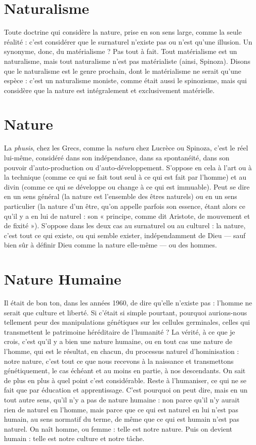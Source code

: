\section{Naturalisme}
Toute doctrine qui considère la nature, prise en son sens
large, comme la seule réalité : c’est considérer que le surnaturel
n’existe pas ou n’est qu’une illusion. Un synonyme, donc, du
matérialisme ? Pas tout à fait. Tout matérialisme est un naturalisme, mais tout
naturalisme n’est pas matérialiste (ainsi, Spinoza). Disons que le naturalisme
est le genre prochain, dont le matérialisme ne serait qu’une espèce : c'est un
naturalisme moniste, comme était aussi le spinozisme, mais qui considère que
la nature est intégralement et exclusivement matérielle.

\section{Nature}
La {\it phusis}, chez les Grecs, comme la {\it natura} chez Lucrèce ou Spinoza,
c’est le réel lui-même, considéré dans son indépendance,
dans sa spontanéité, dans son pouvoir d’auto-production ou d’auto-développement.
S’oppose en cela à l’art ou à la technique (comme ce qui se fait tout seul
à ce qui est fait par l’homme) et au divin (comme ce qui se développe ou
change à ce qui est immuable). Peut se dire en un sens général (la nature est
l’ensemble des êtres naturels) ou en un sens particulier (la nature d’un être,
qu’on appelle parfois son essence, étant alors ce qu’il y a en lui de naturel : son
« principe, comme dit Aristote, de mouvement et de fixité »). S’oppose dans les
deux cas au surnaturel ou au culturel : la nature, c’est tout ce qui existe, ou qui
semble exister, indépendamment de Dieu — sauf bien sûr à définir Dieu comme
la nature elle-même — ou des hommes.

\section{Nature Humaine}
Il était de bon ton, dans les années 1960, de dire
qu’elle n’existe pas : l’homme ne serait que culture et
liberté. Si c'était si simple pourtant, pourquoi aurions-nous tellement peur des
manipulations génétiques sur les cellules germinales, celles qui transmettent le
patrimoine héréditaire de l'humanité ? La vérité, à ce que je crois, c’est qu’il y
a bien une nature humaine, ou en tout cas une nature de l’homme, qui est le
résultat, en chacun, du processus naturel d’hominisation : notre nature, c’est
tout ce que nous recevons à la naissance et transmettons génétiquement, le cas
échéant et au moins en partie, à nos descendants. On sait de plus en plus à quel
point c’est considérable. Reste à l’humaniser, ce qui ne se fait que par éducation
et apprentissage. C’est pourquoi on peut dire, mais en un tout autre sens, qu’il
n'y a pas de nature humaine : non parce qu’il n’y aurait rien de naturel en
l’homme, mais parce que ce qui est naturel en lui n’est pas humain, au sens
normatif du terme, de même que ce qui est humain n’est pas naturel. On naît
homme, ou femme : telle est notre nature. Puis on devient humain : telle est
notre culture et notre tâche.

